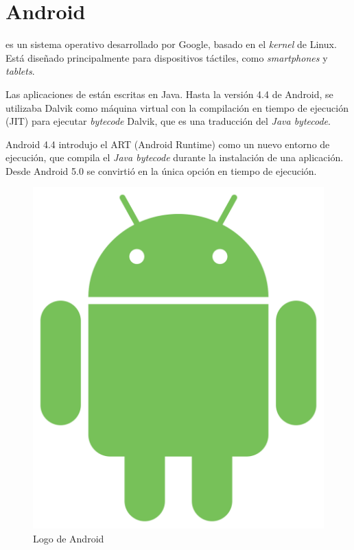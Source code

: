 
\section{Android}

 es un sistema operativo desarrollado por Google, basado en el \emph{kernel} de Linux.
Está diseñado principalmente para dispositivos táctiles, como \emph{smartphones} y \emph{tablets}.

Las aplicaciones de  están escritas en Java.
Hasta la versión 4.4 de Android, se utilizaba Dalvik como máquina virtual con la compilación
en tiempo de ejecución (JIT) para ejecutar \emph{bytecode} Dalvik, que es una traducción del
\emph{Java bytecode}.

Android 4.4 introdujo el ART (Android Runtime) como un nuevo entorno de ejecución, que
compila el \emph{Java bytecode} durante la instalación de una aplicación. Desde Android
5.0 se convirtió en la única opción en tiempo de ejecución. \emph{\parencite{Reference7}}

\begin{figure}[ht]
  \centering
  \includegraphics[scale=0.1]{Figures/AndroidLogo}
  \decoRule
  \caption[Android (Logo)]{Logo de Android \emph{\parencite{Reference3}}}
  \label{fig:AndroidLogo}
\end{figure}

